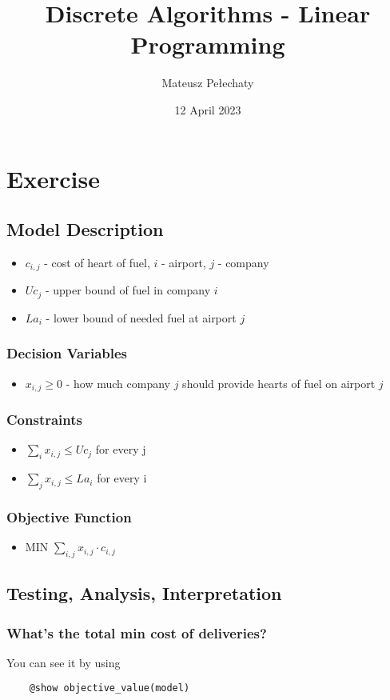 \documentclass[11pt]{article}
\title{Discrete Algorithms - Linear Programming}
\author{Mateusz Pełechaty}
\date{12 April 2023}%
\begin{document}
\maketitle
\section{Exercise}
\subsection{Model Description}
\begin{itemize}
    \item $c_{i,j}$ - cost of heart of fuel, $i$ - airport, $j$ - company
    \item $Uc_j$ - upper bound of fuel in company $i$
    \item $La_i$ - lower bound of needed fuel at airport $j$
\end{itemize}
\subsubsection*{Decision Variables}
\begin{itemize}
    \item $x_{i,j} \geq 0$ - how much company $j$ should provide hearts of fuel on airport $j$ 
\end{itemize}
\subsubsection*{Constraints}
\begin{itemize}
    \item $\sum_{i} x_{i, j} \leq Uc_j$ for every j
    \item $\sum_{j} x_{i, j} \leq La_i$ for every i
\end{itemize}
\subsubsection*{Objective Function}
\begin{itemize}
    \item MIN $\sum_{i,j} x_{i,j} \cdot c_{i,j} $
\end{itemize}
\subsection{Testing, Analysis, Interpretation}
\subsubsection*{What's the total min cost of deliveries?}
You can see it by using \begin{verbatim}
    @show objective_value(model)
\end{verbatim}
\end{document}
